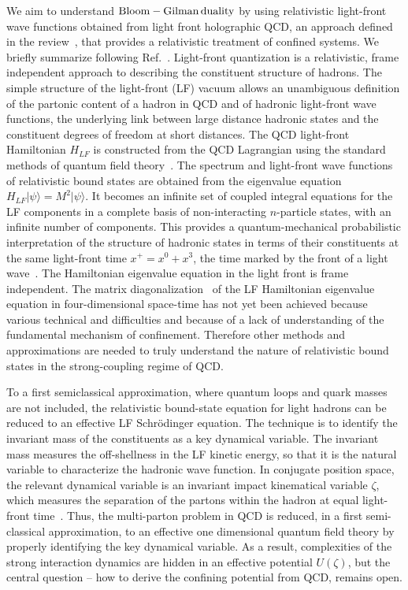 \documentclass[aps,prd,amsmath,longbibliography]{revtex4-1}
\def\BGs{\rm Bloom-Gilman\,duality}
\begin{document}
{We aim   to understand $\BGs$ by using relativistic light-front wave functions obtained from
light front holographic QCD, an approach defined in the review~\cite{Brodsky:2014yha}, that provides a relativistic treatment of confined systems.  We briefly summarize following Ref.~\cite{Brodsky:2014yha}. 
Light-front quantization is a relativistic, frame independent approach   to describing  the constituent structure of hadrons. The simple structure of the light-front (LF) vacuum allows an unambiguous definition of the partonic content of a hadron in QCD and of hadronic light-front wave functions, the underlying link between large distance hadronic states and the constituent degrees of freedom at short distances.   The QCD light-front Hamiltonian $H_{LF}$  is constructed from the QCD Lagrangian using the  standard methods of quantum field theory~\cite{Brodsky:1997de}.  The spectrum and light-front wave functions of relativistic bound states are obtained from the eigenvalue equation  $H_{LF} \vert  \psi \rangle  = M^2 \vert  \psi \rangle$. It becomes an infinite set of coupled integral equations for the LF components  %
 in a complete basis of non-interacting $n$-particle states, with an infinite number of components. This provides a quantum-mechanical probabilistic interpretation of the structure of hadronic states in terms of their constituents at the same light-front time  $x^+ = x^0 + x^3$, the time marked by the front of a light wave~\cite{Dirac:1949cp}.   The Hamiltonian eigenvalue equation  in the light front is frame independent.   The matrix diagonalization~\cite{Brodsky:1997de} of the LF Hamiltonian eigenvalue equation in four-dimensional space-time has not yet been achieved  because various technical and difficulties and because of a lack of understanding of the fundamental mechanism of confinement. Therefore other methods and approximations  are needed to truly  understand the nature of relativistic bound states in the strong-coupling regime of QCD.



To a first semiclassical approximation, where quantum loops and quark masses are not included, the relativistic bound-state equation for  light hadrons can be reduced to an effective LF Schr\"odinger equation. The technique is to  identify the invariant mass of the constituents  as a key dynamical variable. The invariant mass  measures  the off-shellness in  the LF kinetic energy,  so that it is the natural variable to characterize the hadronic wave function.  In conjugate position space, the relevant dynamical variable  is an invariant impact kinematical variable $\zeta$, which measures the separation of the partons within the hadron at equal light-front  time~\cite{deTeramond:2008ht}.  Thus,  the multi-parton problem  in QCD is reduced, in   a first semi-classical approximation, to an effective one dimensional quantum field theory by properly identifying the key dynamical variable.  As a result,  complexities of the strong interaction dynamics are hidden in an effective potential $U(\zeta)$,  but the central question -- how to derive the confining  potential from QCD, remains open.


}
\end{document}
